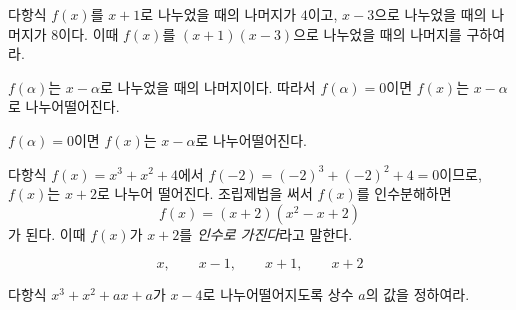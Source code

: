 \documentclass{oblivoir}
\begin{document}
%
\prob{}\label{iden10}
다항식 \(f(x)\)를 \(x+1\)로 나누었을 때의 나머지가 \(4\)이고, \(x-3\)으로 나누었을 때의 나머지가 \(8\)이다.
이때 \(f(x)\)를 \((x+1)(x-3)\)으로 나누었을 때의 나머지를 구하여라.

\clearpage
\(f(\alpha)\)는 \(x-\alpha\)로 나누었을 때의 나머지이다.
따라서 \(f(\alpha)=0\)이면 \(f(x)\)는 \(x-\alpha\)로 나누어떨어진다.
\begin{mdframed}
%
\(f(\alpha)=0\)이면 \(f(x)\)는 \(x-\alpha\)로 나누어떨어진다.
\end{mdframed}

%
\exam{}
다항식 \(f(x)=x^3+x^2+4\)에서 \(f(-2)=(-2)^3+(-2)^2+4=0\)이므로, \(f(x)\)는 \(x+2\)로 나누어 떨어진다.
조립제법을 써서 \(f(x)\)를 인수분해하면
\[f(x)=(x+2)(x^2-x+2)\]
가 된다.
이때 \(f(x)\)가 \(x+2\)를 \emph{인수로 가진다}라고 말한다.

%
\label{iden11}
\begin{mdframed}[skipabove=-10pt,innertopmargin=-3pt,leftmargin=60pt,rightmargin=60pt]
\[x,\qquad x-1,\qquad x+1,\qquad x+2\]
\end{mdframed}

%
\prob{}\label{iden12}
다항식 \(x^3+x^2+ax+a\)가 \(x-4\)로 나누어떨어지도록 상수 \(a\)의 값을 정하여라.



\end{document}
